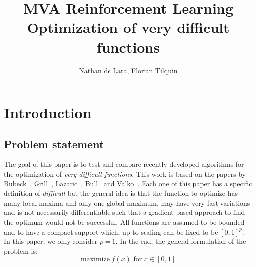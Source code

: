 \documentclass[a4paper,10pt]{article}
\begin{document}
\title{MVA Reinforcement Learning\\
Optimization of very difficult functions}

\author{Nathan de Lara, Florian Tilquin}
\maketitle

\section{Introduction}
\subsection{Problem statement}
The goal of this paper is to test and compare recently developed algorithms for the optimization of \textit{very difficult functions}. This work is based on the papers by Bubeck~\cite{bubeck2011x}, Grill~\cite{grill2015black}, Lazaric~\cite{azar2014online}, Bull~\cite{bull2013adaptive} and Valko~\cite{valko2013stochastic}. Each one of this paper has a specific definition of \textit{difficult} but the general idea is that the function to optimize has many local maxima and only one global maximum, may have very fast variations and is not necessarily differentiable such that a gradient-based approach to find the optimum would not be successful. All functions are assumed to be bounded and to have a compact support which, up to scaling can be fixed to be $[0,1]^p$. In this paper, we only consider $p=1$. In the end, the general formulation of the problem is:
\begin{equation}
\mbox{maximize } f(x) \mbox{ for } x\in [0,1]
\end{equation}
\end{document}

